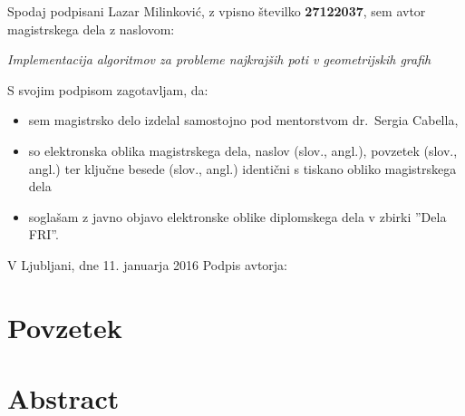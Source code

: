 \documentclass[a4paper, 12pt]{book}
\newcommand{\clearemptydoublepage}{\newpage{\pagestyle{empty}\cleardoublepage}}
\begin{document}
\vspace{1cm}
\noindent Spodaj podpisani Lazar Milinković,
z vpisno številko \textbf{27122037}, sem avtor magistrskega dela z naslovom:
   
\vspace{0.5cm}
\emph{Implementacija algoritmov za probleme najkrajših poti v geometrijskih grafih}

\vspace{1.5cm}
\noindent S svojim podpisom zagotavljam, da:
\begin{itemize}
	\item sem magistrsko delo izdelal samostojno pod mentorstvom 
		dr.\ Sergia Cabella,

	\item	so elektronska oblika magistrskega dela, naslov (slov., angl.), povzetek (slov., angl.) ter ključne besede (slov., angl.) identični s tiskano obliko magistrskega dela
	\item soglašam z javno objavo elektronske oblike diplomskega dela v zbirki ''Dela FRI''.
\end{itemize}

\vspace{1cm}
\noindent V Ljubljani, dne 11. januarja 2016 \hfill Podpis avtorja:

\clearemptydoublepage

\thispagestyle{empty}\mbox{}\vfill\null\it%
 
\rm\normalfont

\clearemptydoublepage


\def\thepage{}%
\tableofcontents{}


\clearemptydoublepage

\chapter*{Povzetek}
 

\chapter*{Abstract}


\clearemptydoublepage
\end{document}
